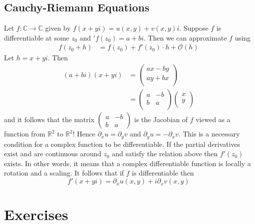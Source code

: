 \documentclass{article}
\newcommand{\R}{\mathbb{R}}
\newcommand{\C}{\mathbb{C}}
\theoremstyle{remark}
\begin{document}
    \subsection{Cauchy-Riemann Equations}
    Let $f:\C\to\C$ given by $f(x+yi)=u(x,y)+v(x,y)i$. Suppose $f$ is differentiable at some $z_0$ and $'f(z_0)=a+bi$.
    Then we can approximate $f$ using
    \begin{align*}
        f(z_0+h)&=f(z_0)+f'(z_0)\cdot h+\mathcal{O}(h)
    \end{align*}
    Let $h=x+yi$. Then
    \begin{align*}
        (a+bi)(x+yi)&=\begin{pmatrix}
            ax-by\\
            ay+bx\\
        \end{pmatrix}\\
        &=\begin{pmatrix}
            a&-b\\
            b&a\\
        \end{pmatrix}
        \begin{pmatrix}
            x\\ y \\
        \end{pmatrix}
    \end{align*}
    and it follows that the matrix $\begin{pmatrix}a&-b\\b&a   \end{pmatrix}$ is the Jacobian of $f$ viewed as a function from $\R^2$ to $\R^2$!
    Hence $\partial_x u = \partial_y v$ and $\partial_y u = -\partial_x v$. This is a necessary condition for a complex function to be differentiable.
    If the partial derivatives exist and are continuous around $z_0$ and satisfy the relation above then $f'(z_0)$ exists.
    In other words, it means that a complex differentiable function is locally a rotation and a scaling.
    It follows that if $f$ is differentiable then
    $$
        f'(x+yi)=\partial_x u(x,y)+i\partial_x v(x,y)
    $$
    
    
    \newpage
    \section{Exercises}
    
\end{document}
